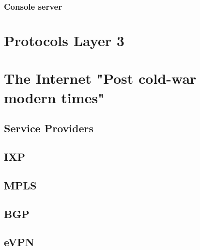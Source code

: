 \documentclass[a4paper,12pt,twoside,twocolumn,landscape]{book}
\begin{document}
\subsection{Console server}


\chapter{Protocols Layer 3}




\chapter{The Internet {\footnotesize "Post cold-war modern times"}}

\section{Service Providers}

\section{IXP}

\section{MPLS}

\section{BGP}

\section{eVPN}


\renewcommand{\listfigurename}{List of {\footnotesize hidden} Figures}
\listoffigures

\end{document}
